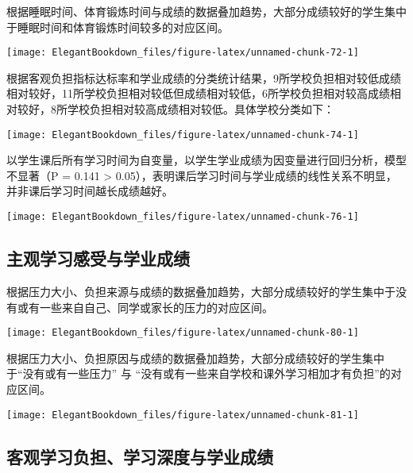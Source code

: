 \documentclass[cn, 11pt, fancy, hide]{elegantbook}
\begin{document}
根据睡眠时间、体育锻炼时间与成绩的数据叠加趋势，大部分成绩较好的学生集中于睡眠时间和体育锻炼时间较多的对应区间。

\begin{center}\texttt{[image: ElegantBookdown\_files/figure-latex/unnamed-chunk-72-1]} \end{center}

根据客观负担指标达标率和学业成绩的分类统计结果，9所学校负担相对较低成绩相对较好，11所学校负担相对较低但成绩相对较低，6所学校负担相对较高成绩相对较好，8所学校负担相对较高成绩相对较低。具体学校分类如下：

\begin{center}\texttt{[image: ElegantBookdown\_files/figure-latex/unnamed-chunk-74-1]} \end{center}

以学生课后所有学习时间为自变量，以学生学业成绩为因变量进行回归分析，模型不显著（P = 0.141 \textgreater{} 0.05），表明课后学习时间与学业成绩的线性关系不明显，并非课后学习时间越长成绩越好。

\begin{center}\texttt{[image: ElegantBookdown\_files/figure-latex/unnamed-chunk-76-1]} \end{center}

\hypertarget{section-25}{%
\subsection{主观学习感受与学业成绩}\label{section-25}}

根据压力大小、负担来源与成绩的数据叠加趋势，大部分成绩较好的学生集中于没有或有一些来自自己、同学或家长的压力的对应区间。

\begin{center}\texttt{[image: ElegantBookdown\_files/figure-latex/unnamed-chunk-80-1]} \end{center}

根据压力大小、负担原因与成绩的数据叠加趋势，大部分成绩较好的学生集中于``没有或有一些压力'' 与 ``没有或有一些来自学校和课外学习相加才有负担''的对应区间。

\begin{center}\texttt{[image: ElegantBookdown\_files/figure-latex/unnamed-chunk-81-1]} \end{center}

\hypertarget{section-26}{%
\subsection{客观学习负担、学习深度与学业成绩}\label{section-26}}
\end{document}
